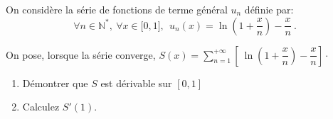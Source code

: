 \documentclass[a4paper,10pt]{report}
\begin{document}
\begin{Exa} On consid\`{e}re la s\'{e}rie de fonctions de terme g\'{e}n\'{e}ral $u_{n}$ d\'{e}finie par: 
\begin{equation*}
\forall n\in \mathbb{N}^{*},\ \forall x\in \lbrack 0,1], \ \ u_{n}\left(x\right) =\ln \left( 1+\dfrac{x}{n}\right) -\dfrac{x}{n}~.
\end{equation*}

On pose, lorsque la s\'{e}rie converge, $S(x)=\displaystyle\sum\limits_{n=1}^{+\infty }\left[ \ \ln \left( 1+\dfrac{x}{n}\right) -\dfrac{x}{n}\right] \cdot$

\begin{enumerate}
\item D\'{e}montrer que $S$ est dérivable sur $[0,1]$
\item Calculez $S'(1)$.
\end{enumerate}
\end{Exa}

\corr 
\end{document}
